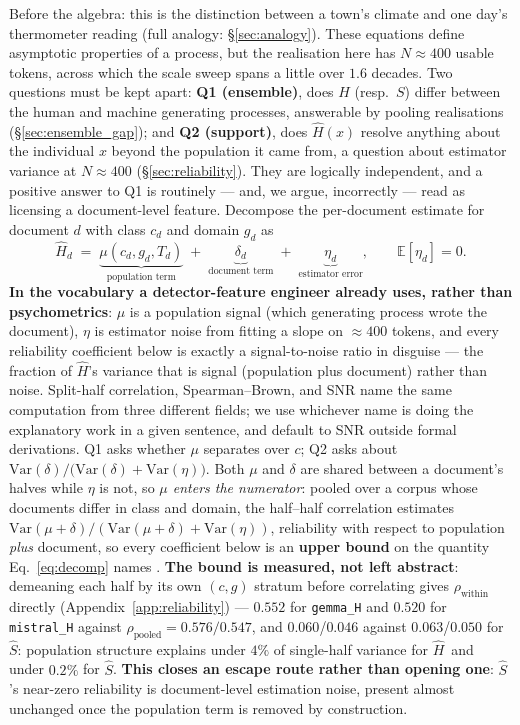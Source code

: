 \documentclass{article}
\newcommand{\Sest}{\ensuremath{\widehat{S}}}
\newcommand{\Hest}{\ensuremath{\widehat{H}}}
\newcommand{\Strue}{\ensuremath{S}}
\newcommand{\Htrue}{\ensuremath{H}}
\begin{document}
Before the algebra: this is the distinction between a town's climate and one
day's thermometer reading (full analogy: \S\ref{sec:analogy}). These
equations define asymptotic properties of a process, but the realisation here
has $N\!\approx\!400$ usable tokens, across which the scale sweep spans a little
over $1.6$ decades. Two questions must be kept apart: \textbf{Q1 (ensemble)}, does
$\Htrue$ (resp.\ $\Strue$) differ between the human and machine generating
processes, answerable by pooling realisations (\S\ref{sec:ensemble_gap}); and
\textbf{Q2 (support)}, does \Hest$(x)$ resolve anything about the individual $x$
beyond the population it came from, a question about estimator variance at
$N\!\approx\!400$ (\S\ref{sec:reliability}). They are logically independent, and a
positive answer to Q1 is routinely --- and, we argue, incorrectly --- read as
licensing a document-level feature. Decompose the per-document estimate for document
$d$ with class $c_d$ and domain $g_d$ as
\begin{equation}
  \Hest_d \;=\; \underbrace{\mu(c_d, g_d, T_d)}_{\text{population term}}
              \;+\; \underbrace{\delta_d}_{\text{document term}}
              \;+\; \underbrace{\eta_d}_{\text{estimator error}},
  \qquad \mathbb{E}[\eta_d]=0 .
  \label{eq:decomp}
\end{equation}
\textbf{In the vocabulary a detector-feature engineer already uses, rather
than psychometrics}: $\mu$ is a population signal (which generating process
wrote the document), $\eta$ is estimator noise from fitting a slope on
$\approx400$ tokens, and every reliability coefficient below is exactly a
signal-to-noise ratio in disguise --- the fraction of \Hest's variance that
is signal (population plus document) rather than noise. Split-half
correlation, Spearman--Brown, and SNR name the same computation from three
different fields; we use whichever name is doing the explanatory work in a
given sentence, and default to SNR outside formal derivations.
Q1 asks whether $\mu$ separates over $c$; Q2 asks about
$\mathrm{Var}(\delta)/\big(\mathrm{Var}(\delta)+\mathrm{Var}(\eta)\big)$. Both
$\mu$ and $\delta$ are shared between a document's halves while $\eta$ is not,
so \emph{$\mu$ enters the numerator}: pooled over a corpus whose documents
differ in class and domain, the half--half correlation estimates
$\mathrm{Var}(\mu\!+\!\delta)/(\mathrm{Var}(\mu\!+\!\delta)+\mathrm{Var}(\eta))$,
reliability with respect to population \emph{plus} document, so every
coefficient below is an \textbf{upper bound} on the quantity
Eq.~\ref{eq:decomp} names \citep{ellis2023spearmanbrown}. \textbf{The bound is
measured, not left abstract}: demeaning each half by its own $(c,g)$ stratum
before correlating gives $\rho_{\text{within}}$ directly
(Appendix~\ref{app:reliability}) --- $0.552$ for \texttt{gemma\_H} and
$0.520$ for \texttt{mistral\_H} against $\rho_{\text{pooled}}=0.576/0.547$,
and $0.060$/$0.046$ against $0.063$/$0.050$ for \Sest: population structure
explains under $4\%$ of single-half variance for \Hest\ and under $0.2\%$ for
\Sest. \textbf{This closes an escape route rather than opening one}: \Sest's
near-zero reliability is document-level estimation noise, present almost
unchanged once the population term is removed by construction.
\end{document}
